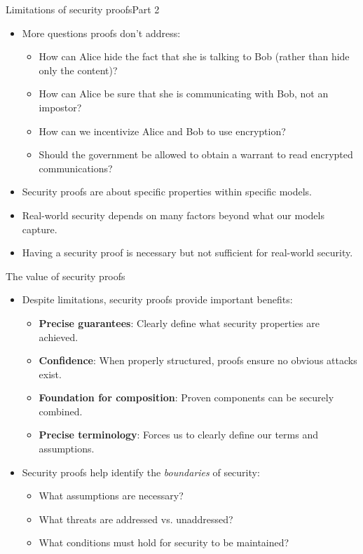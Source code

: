 \documentclass[aspectratio=169, lualatex, handout]{beamer}
\begin{document}
\begin{frame}{Limitations of security proofs}{Part 2}
	\begin{itemize}[<+->]
		\item More questions proofs don't address:
		      \begin{itemize}[<+->]
			      \item How can Alice hide the fact that she is talking to Bob (rather than hide only the content)?
			      \item How can Alice be sure that she is communicating with Bob, not an impostor?
			      \item How can we incentivize Alice and Bob to use encryption?
			      \item Should the government be allowed to obtain a warrant to read encrypted communications?
		      \end{itemize}
		\item Security proofs are about specific properties within specific models.
		\item Real-world security depends on many factors beyond what our models capture.
		\item Having a security proof is necessary but not sufficient for real-world security.
	\end{itemize}
\end{frame}

\begin{frame}{The value of security proofs}
	\begin{itemize}[<+->]
		\item Despite limitations, security proofs provide important benefits:
		      \begin{itemize}[<+->]
			      \item \textbf{Precise guarantees}: Clearly define what security properties are achieved.
			      \item \textbf{Confidence}: When properly structured, proofs ensure no obvious attacks exist.
			      \item \textbf{Foundation for composition}: Proven components can be securely combined.
			      \item \textbf{Precise terminology}: Forces us to clearly define our terms and assumptions.
		      \end{itemize}
		\item Security proofs help identify the \textit{boundaries} of security:
		      \begin{itemize}[<+->]
			      \item What assumptions are necessary?
			      \item What threats are addressed vs. unaddressed?
			      \item What conditions must hold for security to be maintained?
		      \end{itemize}
	\end{itemize}
\end{frame}
\end{document}
